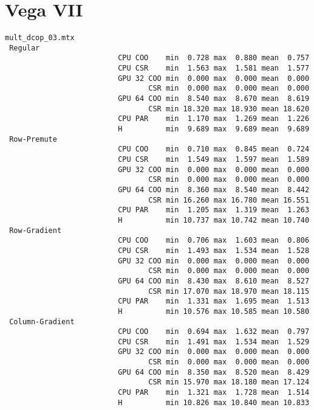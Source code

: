 \newpage
\section{Vega VII}
\label{sec:vega}
\tiny
\twocolumn
\begin{verbatim}
mult_dcop_03.mtx
 Regular
                          CPU COO    min  0.728 max  0.880 mean  0.757
                          CPU CSR    min  1.563 max  1.581 mean  1.577
                          GPU 32 COO min  0.000 max  0.000 mean  0.000
                                 CSR min  0.000 max  0.000 mean  0.000
                          GPU 64 COO min  8.540 max  8.670 mean  8.619
                                 CSR min 18.320 max 18.930 mean 18.620
                          CPU PAR    min  1.170 max  1.269 mean  1.226
                          H          min  9.689 max  9.689 mean  9.689
 Row-Premute
                          CPU COO    min  0.710 max  0.845 mean  0.724
                          CPU CSR    min  1.549 max  1.597 mean  1.589
                          GPU 32 COO min  0.000 max  0.000 mean  0.000
                                 CSR min  0.000 max  0.000 mean  0.000
                          GPU 64 COO min  8.360 max  8.540 mean  8.442
                                 CSR min 16.260 max 16.780 mean 16.551
                          CPU PAR    min  1.205 max  1.319 mean  1.263
                          H          min 10.737 max 10.742 mean 10.740
 Row-Gradient
                          CPU COO    min  0.706 max  1.603 mean  0.806
                          CPU CSR    min  1.493 max  1.534 mean  1.528
                          GPU 32 COO min  0.000 max  0.000 mean  0.000
                                 CSR min  0.000 max  0.000 mean  0.000
                          GPU 64 COO min  8.430 max  8.610 mean  8.527
                                 CSR min 17.070 max 18.970 mean 18.115
                          CPU PAR    min  1.331 max  1.695 mean  1.513
                          H          min 10.576 max 10.585 mean 10.580
 Column-Gradient
                          CPU COO    min  0.694 max  1.632 mean  0.797
                          CPU CSR    min  1.491 max  1.534 mean  1.529
                          GPU 32 COO min  0.000 max  0.000 mean  0.000
                                 CSR min  0.000 max  0.000 mean  0.000
                          GPU 64 COO min  8.350 max  8.520 mean  8.429
                                 CSR min 15.970 max 18.180 mean 17.124
                          CPU PAR    min  1.321 max  1.728 mean  1.514
                          H          min 10.826 max 10.840 mean 10.833

\end{verbatim}
